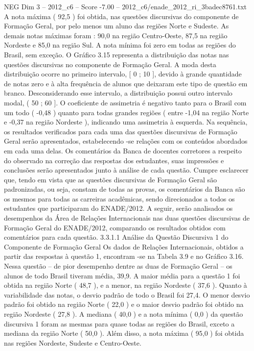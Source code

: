 \begin{textsample}{NEG Dim 3 – 2012\_c6 – Score -7.00 – 2012\_c6/enade\_2012\_ri\_3badec8761.txt}
A nota máxima ( 92,5 ) foi obtida, nas questões discursivas do componente de Formação Geral, por pelo menos um aluno das regiões Norte e Sudeste.
As demais notas máximas foram : 90,0 na região Centro-Oeste, 87,5 na região Nordeste e 85,0 na região Sul.
A nota mínima foi zero em todas as regiões do Brasil, sem exceção.
O Gráfico 3.15 representa a distribuição das notas nas questões discursivas no componente de Formação Geral.
A moda desta distribuição ocorre no primeiro intervalo, [ 0 ; 10 ], devido à grande quantidade de notas zero e à alta frequência de alunos que deixaram este tipo de questão em branco.
Desconsiderando esse intervalo, a distribuição possui outro intervalo modal, ( 50 ; 60 ].
O coeficiente de assimetria é negativo tanto para o Brasil com um todo ( -0,48 ) quanto para todas grandes regiões ( entre -1,04 na região Norte e -0,37 na região Nordeste ), indicando uma assimetria à esquerda.
Na sequência, os resultados verificados para cada uma das questões discursivas de Formação Geral serão apresentados, estabelecendo -se relações com os conteúdos abordados em cada uma delas.
Os comentários da Banca de docentes corretores a respeito do observado na correção das respostas dos estudantes, suas impressões e conclusões serão apresentados junto à análise de cada questão.
Cumpre esclarecer que, tendo em vista que as questões discursivas de Formação Geral são padronizadas, ou seja, constam de todas as provas, os comentários da Banca são os mesmos para todas as carreiras acadêmicas, sendo direcionados a todos os estudantes que participaram do ENADE/2012.
A seguir, serão analisados os desempenhos da Área de Relações Internacionais nas duas questões discursivas de Formação Geral do ENADE/2012, comparando os resultados obtidos com comentários para cada questão. 3.3.1.1 Análise da Questão Discursiva 1 do Componente de Formação Geral Os dados de Relações Internacionais, obtidos a partir das respostas à questão 1, encontram -se na Tabela 3.9 e no Gráfico 3.16.
Nessa questão – de pior desempenho dentre as duas de Formação Geral – os alunos de todo Brasil tiveram média, 39,9.
A maior média para a questão 1 foi obtida na região Norte ( 48,7 ), e a menor, na região Nordeste ( 37,6 ).
Quanto à variabilidade das notas, o desvio padrão de todo o Brasil foi 27,4.
O menor desvio padrão foi obtido na região Norte ( 22,0 ) e o maior desvio padrão foi obtido na região Nordeste ( 27,8 ).
A mediana ( 40,0 ) e a nota mínima ( 0,0 ) da questão discursiva 1 foram as mesmas para quase todas as regiões do Brasil, exceto a mediana da região Norte ( 50,0 ).
Além disso, a nota máxima ( 95,0 ) foi obtida nas regiões Nordeste, Sudeste e Centro-Oeste.

\end{textsample}
